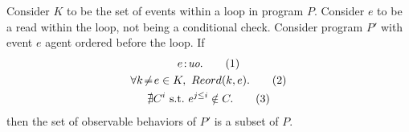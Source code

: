 \begin{corollary}
    \label{LoopInvCodeMotRead1}
    Consider $K$ to be the set of events within a loop in program $P$. 
    Consider $e$ to be a read within the loop, not being a conditional check. 
    Consider program $P'$ with event $e$ agent ordered before the loop. 
    If
    \begin{gather}
        e\!:\!\textit{uo}. \tag{1} \label{licmr1:eq1}\\
        \forall k\!\neq\!e \in K, \ Reord(k, e). \tag{2} \label{licmr1:eq2}\\ 
        \nexists C^i \ \text{s.t.} \ e^{j \leq i} \notin C. \tag{3} \label{licmr1:eq3}                    
    \end{gather}
    then the set of observable behaviors of $P'$ is a subset of $P$.
\end{corollary}

